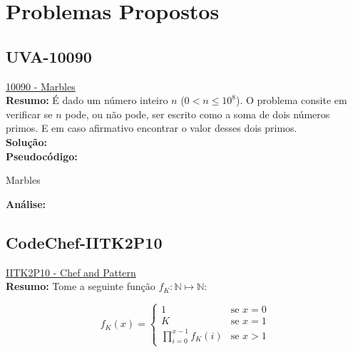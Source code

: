 
\section{Problemas Propostos}



\subsection{UVA-10090}
\href{https://uva.onlinejudge.org/index.php?option=onlinejudge&page=show_problem&problem=1031}{10090 - Marbles}\\


\textbf{Resumo:}
É dado um número inteiro $n$ ($0 < n \leq 10^8$). O problema consite em verificar se $n$ pode, ou não pode, ser escrito como a soma de dois números primos.
E em caso afirmativo encontrar o valor desses dois primos.
\\

\textbf{Solução:}
\\

\textbf{Pseudocódigo:}
\begin{algorithm}
\caption{Marbles}
\begin{algorithmic}[1]

\EndProcedure
\end{algorithmic}
\end{algorithm}


\textbf{Análise:}



\subsection{CodeChef-IITK2P10}
\href{https://www.codechef.com/problems/IITK2P10}{IITK2P10 - Chef and Pattern}\\


\textbf{Resumo:}
Tome a seguinte função $f_K:\mathbb{N} \longmapsto \mathbb{N}$:

\[
 f_K(x) = 
  \begin{cases} 
   1 & \text{se } x = 0 \\
   K & \text{se } x = 1 \\
   \prod_{i=0}^{x-1}f_K(i) & \text{se } x > 1
  \end{cases}
\]

